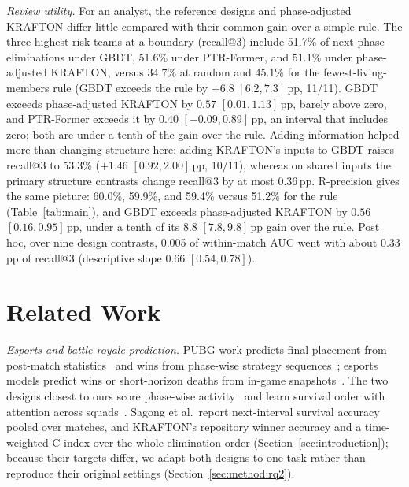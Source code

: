 \documentclass[sigconf,anonymous]{acmart}
\begin{document}
\emph{Review utility.} For an analyst, the reference designs and phase-adjusted KRAFTON differ little compared with their common gain over a simple rule. The three highest-risk teams at a boundary (recall@3) include 51.7\% of next-phase eliminations under GBDT, 51.6\% under PTR-Former, and 51.1\% under phase-adjusted KRAFTON, versus 34.7\% at random and 45.1\% for the fewest-living-members rule (GBDT exceeds the rule by $+6.8$ $[6.2,\allowbreak 7.3]$\,pp, 11/11). GBDT exceeds phase-adjusted KRAFTON by $0.57$ $[0.01,\allowbreak 1.13]$\,pp, barely above zero, and PTR-Former exceeds it by $0.40$ $[-0.09,\allowbreak 0.89]$\,pp, an interval that includes zero; both are under a tenth of the gain over the rule. Adding information helped more than changing structure here: adding KRAFTON's inputs to GBDT raises recall@3 to 53.3\% ($+1.46$ $[0.92,\allowbreak 2.00]$\,pp, 10/11), whereas on shared inputs the primary structure contrasts change recall@3 by at most 0.36\,pp. R-precision gives the same picture: 60.0\%, 59.9\%, and 59.4\% versus 51.2\% for the rule (Table~\ref{tab:main}), and GBDT exceeds phase-adjusted KRAFTON by $0.56$ $[0.16,\allowbreak 0.95]$\,pp, under a tenth of its $8.8$ $[7.8,\allowbreak 9.8]$\,pp gain over the rule. Post hoc, over nine design contrasts, 0.005 of within-match AUC went with about 0.33\,pp of recall@3 (descriptive slope 0.66 $[0.54,\allowbreak 0.78]$).

\section{Related Work}
\label{sec:related}
\emph{Esports and battle-royale prediction.} PUBG work predicts final placement from post-match statistics~\cite{KagglePUBG,LeeLee25} and wins from phase-wise strategy sequences~\cite{SagongKim25}; esports models predict wins or short-horizon deaths from in-game snapshots~\cite{Hodge21,Katona19,Marshall22}. The two designs closest to ours score phase-wise activity~\cite{Sagong25a} and learn survival order with attention across squads~\cite{KRAFTON}. Sagong et al.\ report next-interval survival accuracy pooled over matches, and KRAFTON's repository winner accuracy and a time-weighted C-index over the whole elimination order (Section~\ref{sec:introduction}); because their targets differ, we adapt both designs to one task rather than reproduce their original settings (Section~\ref{sec:method:rq2}).
\end{document}
